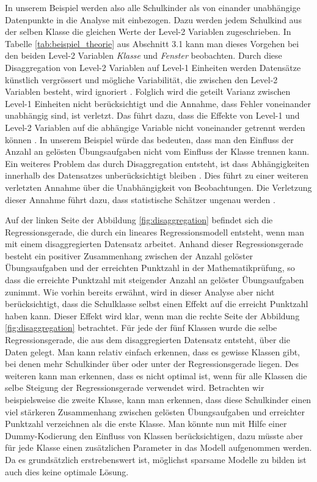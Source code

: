 \documentclass[12pt]{article}\usepackage[]{graphicx}\usepackage[]{color}
\numberwithin{equation}{section}
\begin{document}
In unserem Beispiel werden also alle Schulkinder als von einander unabhängige Datenpunkte in die Analyse mit einbezogen. Dazu werden jedem Schulkind aus der selben Klasse die gleichen Werte der Level-2 Variablen zugeschrieben. In Tabelle \ref{tab:beispiel_theorie} aus Abschnitt 3.1 kann man dieses Vorgehen bei den beiden Level-2 Variablen \textit{Klasse} und \textit{Fenster} beobachten. Durch diese Disaggregation von Level-2 Variablen auf Level-1 Einheiten werden Datensätze künstlich vergrössert und mögliche Variabilität, die zwischen den Level-2 Variablen besteht, wird ignoriert \citep{SnijdersTomA.B2012Ma:a, woltman2012introduction}. Folglich wird die geteilt Varianz zwischen Level-1 Einheiten nicht berücksichtigt und die Annahme, dass Fehler voneinander unabhängig sind, ist verletzt. Das führt dazu, dass die Effekte von Level-1 und Level-2 Variablen auf die abhängige Variable nicht voneinander getrennt werden können \citep{woltman2012introduction}. In unserem Beispiel würde das bedeuten, dass man den Einfluss der Anzahl an gelösten Übungsaufgaben nicht vom Einfluss der Klasse trennen kann. Ein weiteres Problem das durch Disaggregation entsteht, ist dass Abhängigkeiten innerhalb des Datensatzes unberücksichtigt bleiben \citep{woltman2012introduction}. Dies führt zu einer weiteren verletzten Annahme über die Unabhängigkeit von Beobachtungen. Die Verletzung dieser Annahme führt dazu, dass statistische Schätzer ungenau werden \citep{andrew_data, SnijdersTomA.B2012Ma:a, woltman2012introduction}.

Auf der linken Seite der Abbildung \ref{fig:disaggregation} befindet sich die Regressionsgerade, die durch ein lineares Regressionsmodell entsteht, wenn man mit einem disaggregierten Datensatz arbeitet. Anhand dieser Regressionsgerade besteht ein positiver Zusammenhang zwischen der Anzahl gelöster Übungsaufgaben und der erreichten Punktzahl in der Mathematikprüfung, so dass die erreichte Punktzahl mit steigender Anzahl an gelöster Übungsaufgaben zunimmt. Wie vorhin bereits erwähnt, wird in dieser Analyse aber nicht berücksichtigt, dass die Schulklasse selbst einen Effekt auf die erreicht Punktzahl haben kann. Dieser Effekt wird klar, wenn man die rechte Seite der Abbildung \ref{fig:disaggregation} betrachtet. Für jede der fünf Klassen wurde die selbe Regressionsgerade, die aus dem disaggregierten Datensatz entsteht, über die Daten gelegt. Man kann relativ einfach erkennen, dass es gewisse Klassen gibt, bei  denen mehr Schulkinder über oder unter der Regressionsgerade liegen. Des weiteren kann man erkennen, dass es nicht optimal ist, wenn für alle Klassen die selbe Steigung der Regressionsgerade verwendet wird. Betrachten wir beispielsweise die zweite Klasse, kann man erkennen, dass diese Schulkinder einen viel stärkeren Zusammenhang zwischen gelösten Übungsaufgaben und erreichter Punktzahl verzeichnen als die erste Klasse. Man könnte nun mit Hilfe einer Dummy-Kodierung den Einfluss von Klassen berücksichtigen, dazu müsste aber für jede Klasse einen zusätzlichen Parameter in das Modell aufgenommen werden. Da es grundsätzlich erstrebenswert ist, möglichst sparsame Modelle zu bilden ist auch dies keine optimale Lösung.
\end{document}
